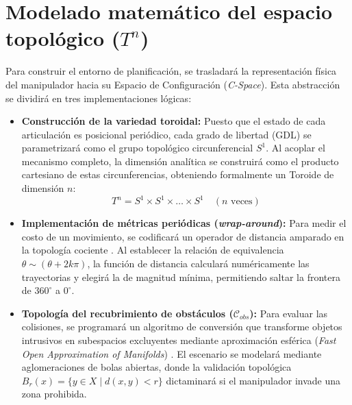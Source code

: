 \section{Modelado matemático del espacio topológico ($T^n$)}
Para construir el entorno de planificación, se trasladará la representación física del manipulador hacia su Espacio de Configuración (\textit{C-Space}). Esta abstracción se dividirá en tres implementaciones lógicas:

\begin{itemize}
    \item \textbf{Construcción de la variedad toroidal:} Puesto que el estado de cada articulación es posicional periódico, cada grado de libertad (GDL) se parametrizará como el grupo topológico circunferencial $S^1$. Al acoplar el mecanismo completo, la dimensión analítica se construirá como el producto cartesiano de estas circunferencias, obteniendo formalmente un Toroide de dimensión $n$:
    \begin{equation}
        T^n = S^1 \times S^1 \times \dots \times S^1 \quad (n \text{ veces})
    \end{equation}
    
    \item \textbf{Implementación de métricas periódicas (\textit{wrap-around}):} Para medir el costo de un movimiento, se codificará un operador de distancia amparado en la topología cociente \parencite{antonyan2016topologia}. Al establecer la relación de equivalencia $\theta \sim (\theta + 2k\pi)$, la función de distancia calculará numéricamente las trayectorias y elegirá la de magnitud mínima, permitiendo saltar la frontera de $360^\circ$ a $0^\circ$.
    
    \item \textbf{Topología del recubrimiento de obstáculos ($\mathcal{C}_{obs}$):} Para evaluar las colisiones, se programará un algoritmo de conversión que transforme objetos intrusivos en subespacios excluyentes mediante aproximación esférica (\textit{Fast Open Approximation of Manifolds}) \parencite{coumar2025foam}. El escenario se modelará mediante aglomeraciones de bolas abiertas, donde la validación topológica $B_r(x) = \{y \in X \mid d(x,y) < r\}$ dictaminará si el manipulador invade una zona prohibida.
\end{itemize}

